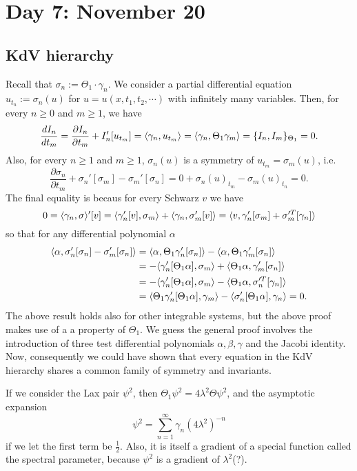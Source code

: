\documentclass{../../../small}
\begin{document}
\newpage
\section{Day 7: November 20}


\subsection*{KdV hierarchy}

Recall that $\sigma_n:=\Theta_1\cdot\gamma_n$.
We consider a partial differential equation $u_{t_n}:=\sigma_n(u)$ for $u=u(x,t_1,t_2,\cdots)$ with infinitely many variables.
Then, for every $n\ge0$ and $m\ge1$, we have
\[\frac{dI_n}{dt_m}=\frac{\partial I_n}{\partial t_m}+I_n'[u_{t_m}]=\langle\gamma_n,u_{t_m}\rangle=\langle\gamma_n,\Theta_1\gamma_m\rangle=\{I_n,I_m\}_{\Theta_1}=0.\]
Also, for every $n\ge1$ and $m\ge1$, $\sigma_n(u)$ is a symmetry of $u_{t_m}=\sigma_m(u)$, i.e.
\[\frac{\partial\sigma_n}{\partial t_m}+\sigma_n'[\sigma_m]-\sigma_m'[\sigma_n]=0+\sigma_n(u)_{t_m}-\sigma_m(u)_{t_n}=0.\]
The final equality is becaus for every Schwarz $v$ we have
\[0=\langle\gamma_n,\sigma\rangle'[v]=\langle\gamma'_n[v],\sigma_m\rangle+\langle\gamma_n,\sigma_m'[v]\rangle=\langle v,\gamma_n'[\sigma_m]+\sigma_m'^T[\gamma_n]\rangle\]
so that for any differential polynomial $\alpha$
\begin{align*}
\langle\alpha,\sigma_n'[\sigma_n]-\sigma'_m[\sigma_n]\rangle
&=\langle\alpha,\Theta_1\gamma_n'[\sigma_n]\rangle-\langle\alpha,\Theta_1\gamma'_m[\sigma_n]\rangle\\
&=-\langle\gamma_n'[\Theta_1\alpha],\sigma_m\rangle+\langle\Theta_1\alpha,\gamma_m'[\sigma_n]\rangle\\
&=-\langle\gamma_n'[\Theta_1\alpha],\sigma_m\rangle-\langle\Theta_1\alpha,\sigma_n'^T[\gamma_n]\rangle\\
&=\langle\Theta_1\gamma_n'[\Theta_1\alpha],\gamma_m\rangle-\langle\sigma_n'[\Theta_1\alpha],\gamma_n\rangle=0.
\end{align*}
The above result holds also for other integrable systems, but the above proof makes use of a a property of $\Theta_1$.
We guess the general proof involves the introduction of three test differential polynomials $\alpha,\beta,\gamma$ and the Jacobi identity.
Now, consequently we could have shown that every equation in the KdV hierarchy shares a common family of symmetry and invariants.

If we consider the Lax pair $\psi^2$, then $\Theta_1\psi^2=4\lambda^2\Theta\psi^2$, and the asymptotic expansion
\[\psi^2=\sum_{n=1}^\infty \gamma_n(4\lambda^2)^{-n}\]
if we let the first term be $\frac12$.
Also, it is itself a gradient of a special function called the spectral parameter, because $\psi^2$ is a gradient of $\lambda^2$(?).
\end{document}
